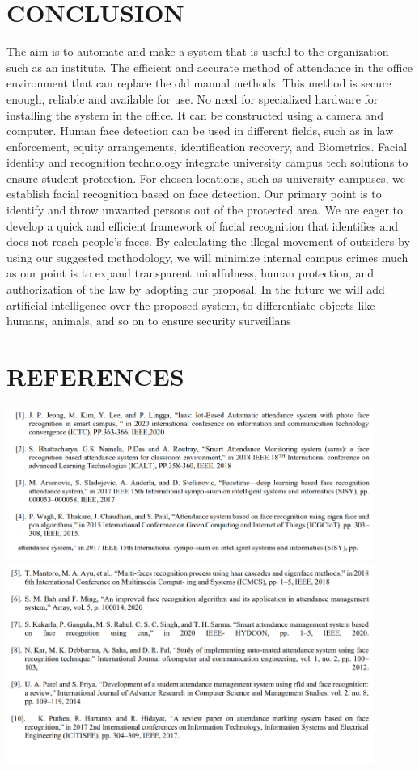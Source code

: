 \section {CONCLUSION}
The aim is to automate and make a system that is useful to the organization such as an institute. The efficient and accurate
method of attendance in the office environment that can replace the old manual methods. This method is secure enough,
reliable and available for use.
No need for specialized hardware for installing the system in the office. It can be constructed using a camera and
computer. Human face detection can be used in different fields, such as in law enforcement, equity arrangements,
identification recovery, and Biometrics.
Facial identity and recognition technology integrate university campus tech solutions to ensure student protection. For
chosen locations, such as university campuses, we establish facial recognition based on face detection.
Our primary point is to identify and throw unwanted persons out of the protected area. We are eager to develop a quick
and efficient framework of facial recognition that identifies and does not reach people's faces.
By calculating the illegal movement of outsiders by using our suggested methodology, we will minimize internal campus
crimes much as our point is to expand transparent mindfulness, human protection, and authorization of the law by
adopting our proposal. In the future we will add artificial intelligence over the proposed system, to differentiate
objects like humans, animals, and so on to ensure security surveillans

\section {REFERENCES}
\includegraphics[width=0.9\textwidth]{ref.png}\\
\includegraphics[width=0.9\textwidth]{ref2.png}



